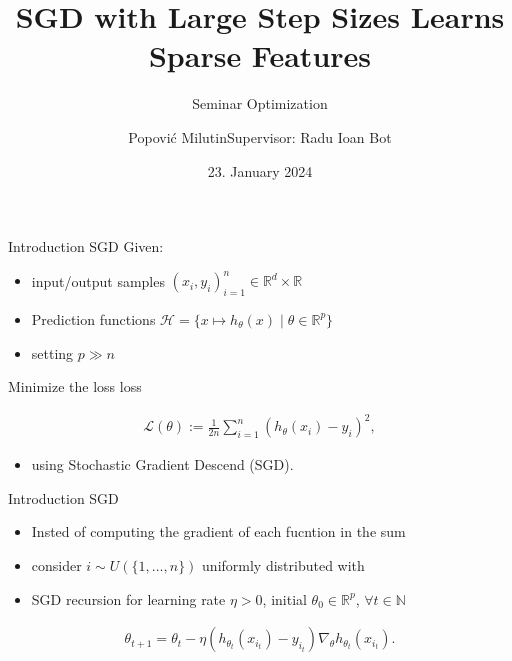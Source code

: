 \documentclass[fleqn]{beamer}
\title
{SGD with Large Step Sizes Learns Sparse Features}
\subtitle{Seminar Optimization}
\author[Popović Milutin]
{Popović Milutin\newline\newline Supervisor: Radu Ioan Bot}
\date{23. January 2024}
\begin{document}
    \begin{frame}
        \maketitle
    \end{frame}

    \begin{frame}{Introduction SGD}
    Given:
        \begin{itemize}
            \item input/output samples $(x_i, y_i)_{i=1}^{n} \in
                \mathbb{R}^{d} \times \mathbb{R}$
            \item Prediction functions
                $\mathcal{H} = \{x \mapsto h_{\theta}(x)\; | \; \theta \in
                \mathbb{R}^{p}\}$
            \item setting $p \gg n$
        \end{itemize}
    Minimize the loss loss
    \begin{center}
        \begin{minipage}{0.5\textwidth}
            \begin{align*}
                \mathcal{L}(\theta) := \frac{1}{2n} \sum_{i=1}^{n} \left(
                h_\theta(x_i) - y_i \right)^{2},
            \end{align*}
        \end{minipage}
    \end{center}
    \begin{itemize}
        \item using Stochastic Gradient Descend (SGD).
    \end{itemize}
    \end{frame}

    \begin{frame}{Introduction SGD}

        \begin{itemize}
            \item Insted of computing the gradient of each fucntion in the
                sum \item consider $i \sim U(\{1,\ldots,n\} )$ uniformly distributed with
            \item SGD recursion for learning rate $\eta > 0$, initial $\theta_0
                \in \mathbb{R}^{p}$, $\forall t \in \mathbb{N}$
        \end{itemize}
        \begin{center}
            \begin{minipage}{0.5\textwidth}
                \begin{align*}
                    \theta_{t+1} = \theta_t - \eta\left(h_{\theta_t}(x_{i_t})
                    - y_{i_t}\right)
                    \nabla_{\theta} h_{\theta_t}(x_{i_t}).
                \end{align*}
            \end{minipage}
        \end{center}

    \end{frame}
\end{document}

